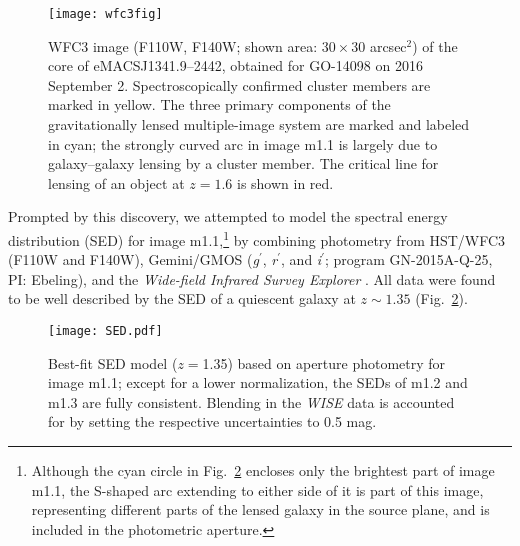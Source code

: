\documentclass[twocolumn,times]{aastex61}
\begin{document}
\begin{figure}
\texttt{[image: wfc3fig]}
\caption{WFC3 image (F110W, F140W; shown area: $30{\times}30$ arcsec$^2$) of the core of eMACSJ1341.9--2442, obtained for GO-14098 on 2016 September 2.  Spectroscopically confirmed cluster members are marked in yellow. The three primary components of the gravitationally lensed multiple-image system are marked and labeled in cyan; the strongly curved arc in image m1.1 is largely due to galaxy--galaxy lensing by a cluster member. The critical line for lensing of an object at $z{=}1.6$ is shown in red.\label{fig:hst}}
\end{figure}

Prompted by this discovery, we attempted to model the spectral energy distribution (SED) for image m1.1,\footnote{Although the cyan circle in Fig.~\ref{fig:sed} encloses only the brightest part of image m1.1, the S-shaped arc extending to either side of it is part of this image, representing different parts of the lensed galaxy in the source plane, and is included in the photometric aperture.} by combining photometry from HST/WFC3 (F110W and F140W), Gemini/GMOS (\textsl{g}$^\prime$, \textsl{r}$^\prime$, and \textsl{i}$^\prime$; program GN-2015A-Q-25, PI: Ebeling), and the \textsl{Wide-field Infrared Survey Explorer} \citep[\textsl{WISE};][]{Wright2010,Mainzer2011}. All data were found to be well described by the SED of a quiescent galaxy at $z\sim 1.35$ (Fig.~\ref{fig:sed}).

\begin{figure}
\texttt{[image: SED.pdf]}
\caption{Best-fit SED model ($z{=}$1.35) based on aperture photometry for image m1.1; except for a lower normalization, the SEDs of m1.2 and m1.3 are fully consistent. Blending in the \textsl{WISE} data is accounted for by setting the respective uncertainties to 0.5 mag.  \label{fig:sed}}
\end{figure}
\end{document}
